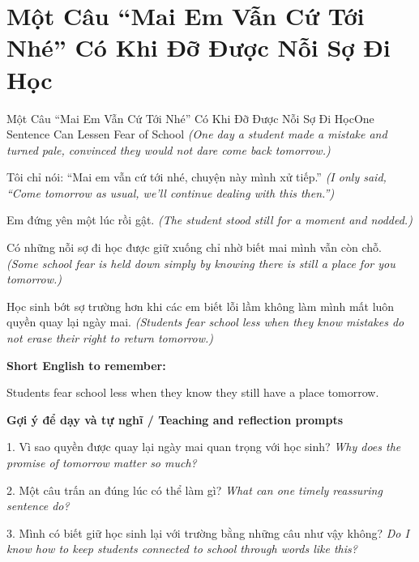 \section{Một Câu “Mai Em Vẫn Cứ Tới Nhé” Có Khi Đỡ Được Nỗi Sợ Đi Học}
\begin{truyen}{Một Câu “Mai Em Vẫn Cứ Tới Nhé” Có Khi Đỡ Được Nỗi Sợ Đi Học}{One Sentence Can Lessen Fear of School}
\textit{(One day a student made a mistake and turned pale, convinced they would not dare come back tomorrow.)}

Tôi chỉ nói: “Mai em vẫn cứ tới nhé, chuyện này mình xử tiếp.”
\textit{(I only said, “Come tomorrow as usual, we'll continue dealing with this then.”)}

Em đứng yên một lúc rồi gật.
\textit{(The student stood still for a moment and nodded.)}

Có những nỗi sợ đi học được giữ xuống chỉ nhờ biết mai mình vẫn còn chỗ.
\textit{(Some school fear is held down simply by knowing there is still a place for you tomorrow.)}

\end{truyen}

\begin{baihoc}
Học sinh bớt sợ trường hơn khi các em biết lỗi lầm không làm mình mất luôn quyền quay lại ngày mai.
\textit{(Students fear school less when they know mistakes do not erase their right to return tomorrow.)}
\end{baihoc}

\begin{ghinhoanh}
\textbf{Short English to remember:}

Students fear school less when they know they still have a place tomorrow.

\end{ghinhoanh}

\begin{tuhocnhanh}
\textbf{Gợi ý để dạy và tự nghĩ / Teaching and reflection prompts}

1. Vì sao quyền được quay lại ngày mai quan trọng với học sinh? \textit{Why does the promise of tomorrow matter so much?}

2. Một câu trấn an đúng lúc có thể làm gì? \textit{What can one timely reassuring sentence do?}

3. Mình có biết giữ học sinh lại với trường bằng những câu như vậy không? \textit{Do I know how to keep students connected to school through words like this?}
\end{tuhocnhanh}
\ngancach

